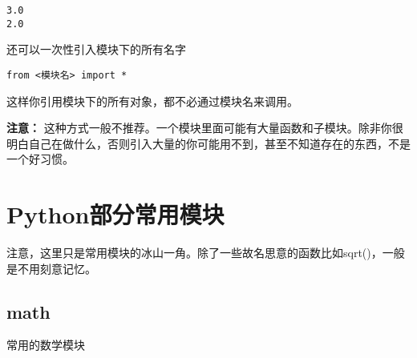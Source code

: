 \documentclass[
  letterpaper,
  DIV=11,
  numbers=noendperiod]{scrreprt}
\begin{document}
\begin{verbatim}
3.0
2.0
\end{verbatim}

还可以一次性引入模块下的所有名字

\begin{verbatim}
from <模块名> import *
\end{verbatim}

这样你引用模块下的所有对象，都不必通过模块名来调用。

\textbf{注意：}
这种方式一般不推荐。一个模块里面可能有大量函数和子模块。除非你很明白自己在做什么，否则引入大量的你可能用不到，甚至不知道存在的东西，不是一个好习惯。

\hypertarget{pythonux90e8ux5206ux5e38ux7528ux6a21ux5757}{%
\section{Python部分常用模块}\label{pythonux90e8ux5206ux5e38ux7528ux6a21ux5757}}

注意，这里只是常用模块的冰山一角。除了一些故名思意的函数比如sqrt()，一般是不用刻意记忆。

\hypertarget{math}{%
\subsection{math}\label{math}}

常用的数学模块
\end{document}
